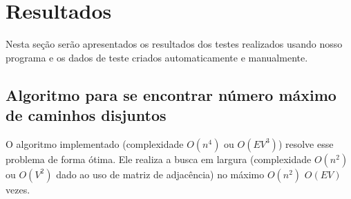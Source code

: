 \section{\esp Resultados}

Nesta seção serão apresentados os resultados dos testes realizados usando nosso programa e os dados de 
teste criados automaticamente e manualmente.

\subsection{\esp Algoritmo para se encontrar número máximo de caminhos disjuntos }
O algoritmo implementado (complexidade $O(n^4)$ ou $O(EV^3)$) resolve esse problema de forma ótima.
Ele realiza a busca em largura (complexidade $O(n^2)$ ou $O(V^2)$ dado ao uso de matriz de adjacência)
no máximo $O(n^2)$ $O(EV)$ vezes.

